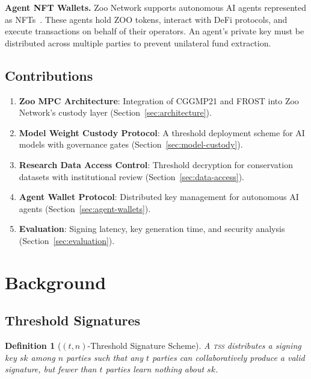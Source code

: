 \documentclass[11pt,letterpaper]{article}
\newtheorem{definition}{Definition}[section]
\newcommand{\TSS}{\textsc{tss}}
\begin{document}
\textbf{Agent NFT Wallets.} Zoo Network supports autonomous AI agents represented as NFTs~\cite{zoo-agent-nft}. These agents hold ZOO tokens, interact with DeFi protocols, and execute transactions on behalf of their operators. An agent's private key must be distributed across multiple parties to prevent unilateral fund extraction.

\subsection{Contributions}

\begin{enumerate}
    \item \textbf{Zoo MPC Architecture}: Integration of CGGMP21 and FROST into Zoo Network's custody layer (Section~\ref{sec:architecture}).

    \item \textbf{Model Weight Custody Protocol}: A threshold deployment scheme for AI models with governance gates (Section~\ref{sec:model-custody}).

    \item \textbf{Research Data Access Control}: Threshold decryption for conservation datasets with institutional review (Section~\ref{sec:data-access}).

    \item \textbf{Agent Wallet Protocol}: Distributed key management for autonomous AI agents (Section~\ref{sec:agent-wallets}).

    \item \textbf{Evaluation}: Signing latency, key generation time, and security analysis (Section~\ref{sec:evaluation}).
\end{enumerate}

\section{Background}

\subsection{Threshold Signatures}

\begin{definition}[$(t, n)$-Threshold Signature Scheme]
A \TSS{} distributes a signing key $sk$ among $n$ parties such that any $t$ parties can collaboratively produce a valid signature, but fewer than $t$ parties learn nothing about $sk$.
\end{definition}
\end{document}
